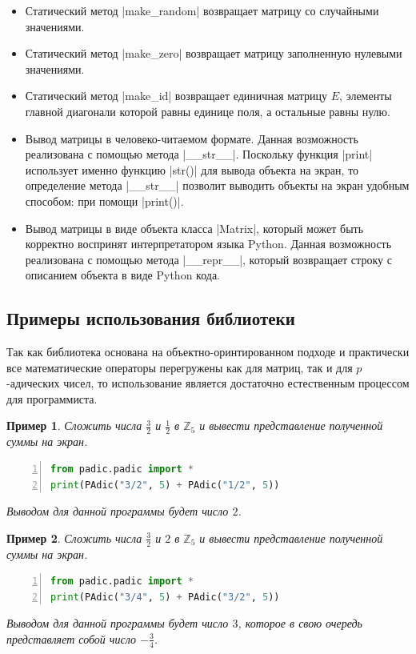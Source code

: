 \documentclass[master, och, diploma, times]{sty/SCWorks}
\theoremstyle{plain}
\newtheorem{exmp}{Пример}[section]
\theoremstyle{definition}
\begin{document}
\begin{itemize}
\item Статический метод |make_random| возвращает матрицу со случайными значениями.
\item Статический метод |make_zero| возвращает матрицу заполненную нулевыми значениями.
\item Статический метод |make_id| возвращает единичная матрицу $E$, элементы главной диагонали которой равны единице поля, а остальные равны нулю.
\item Вывод матрицы в человеко-читаемом формате. Данная возможность реализована с помощью метода |__str__|. Поскольку функция |print| использует именно функцию |str()| для вывода объекта на экран, то определение метода |__str__| позволит выводить объекты на экран удобным способом: при помощи |print()|.
\item Вывод матрицы в виде объекта класса |Matrix|, который может быть корректно воспринят интерпретатором языка Python. Данная возможность реализована с помощью метода |__repr__|, который возвращает строку с описанием объекта в виде Python кода.
\end{itemize}



\subsection{Примеры использования библиотеки}

Так как библиотека основана на объектно-оринтированном подходе и практически все математические операторы перегружены как для матриц, так и для $p$-адических чисел, то использование является достаточно естественным процессом для программиста.

\begin{exmp}
Сложить числа $\frac{3}{2}$ и $\frac{1}{2}$ в $\mathbb{Z}_5$ и вывести представление полученной суммы на экран.
\begin{lstlisting}[language=Python, numbers=left, showstringspaces=false, breaklines=true, basicstyle=\small]
from padic.padic import *
print(PAdic("3/2", 5) + PAdic("1/2", 5))
\end{lstlisting}

\noindent Выводом для данной программы будет число $2$.
\end{exmp}


\begin{exmp}
Сложить числа $\frac{3}{2}$ и $2$ в $\mathbb{Z}_5$ и вывести представление полученной суммы на экран.
\begin{lstlisting}[language=Python, numbers=left, showstringspaces=false, breaklines=true, basicstyle=\small]
from padic.padic import *
print(PAdic("3/4", 5) + PAdic("3/2", 5))
\end{lstlisting}

\noindent Выводом для данной программы будет число $3$, которое в свою очередь представляет собой число $-\frac{3}{4}$.
\end{exmp}
\end{document}
